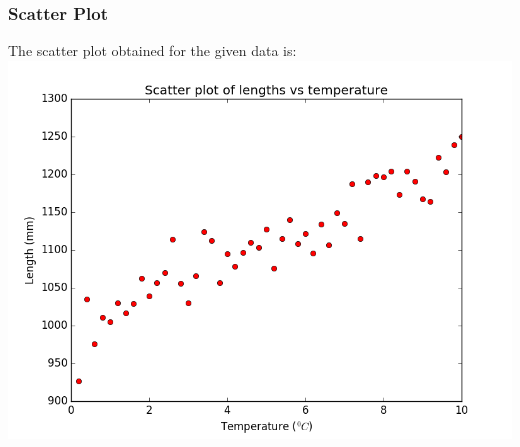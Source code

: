 \documentclass{extarticle}
\begin{document}
		\subsubsection{\color{RoyalBlue} Scatter Plot}
		The scatter plot obtained for the given data is: \\
		\includegraphics[scale=0.75]{scatter} \\
		
\end{document}
